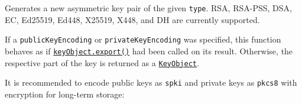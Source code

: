 Generates a new asymmetric key pair of the given \texttt{type}. RSA,
RSA-PSS, DSA, EC, Ed25519, Ed448, X25519, X448, and DH are currently
supported.

If a \texttt{publicKeyEncoding} or \texttt{privateKeyEncoding} was
specified, this function behaves as if
\hyperref[keyobjectexportoptions]{\texttt{keyObject.export()}} had been
called on its result. Otherwise, the respective part of the key is
returned as a \hyperref[class-keyobject]{\texttt{KeyObject}}.

It is recommended to encode public keys as
\texttt{\textquotesingle{}spki\textquotesingle{}} and private keys as
\texttt{\textquotesingle{}pkcs8\textquotesingle{}} with encryption for
long-term storage:

\begin{Shaded}
\begin{Highlighting}[]
\NormalTok{ \{}
\OperatorTok{,}
\NormalTok{\} }\OperatorTok{=}  \NormalTok{(}\NormalTok{)}\OperatorTok{;}

\NormalTok{(}\OperatorTok{,}\NormalTok{ \{}
  \OperatorTok{:} \OperatorTok{,}
  \OperatorTok{:}\NormalTok{ \{}
    \OperatorTok{:} \OperatorTok{,}
    \OperatorTok{:} \OperatorTok{,}
\NormalTok{  \}}\OperatorTok{,}
  \OperatorTok{:}\NormalTok{ \{}
    \OperatorTok{:} \OperatorTok{,}
    \OperatorTok{:} \OperatorTok{,}
    \OperatorTok{:} \OperatorTok{,}
    \OperatorTok{:} \OperatorTok{,}
\NormalTok{  \}}\OperatorTok{,}
\NormalTok{\}}\OperatorTok{,}\OperatorTok{,}\OperatorTok{,}\KeywordTok{=\textgreater{}}\NormalTok{ \{}
\NormalTok{\})}\OperatorTok{;}
\end{Highlighting}
\end{Shaded}

